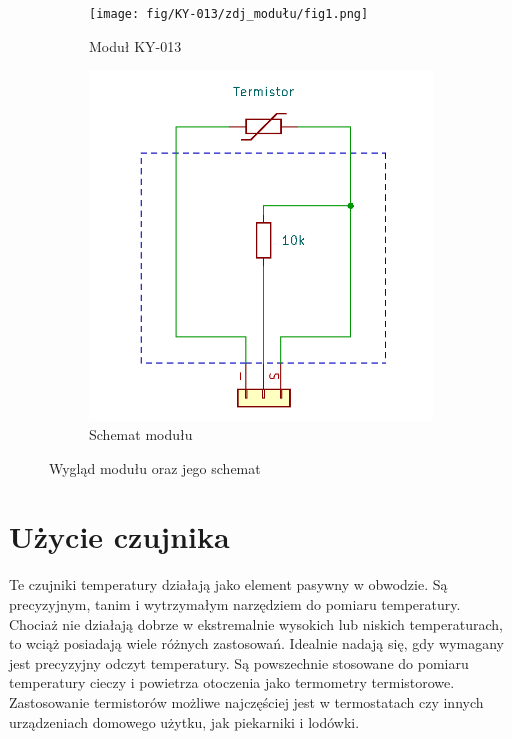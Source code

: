 \documentclass[11pt, a4paper]{article}
\begin{document}
\begin{figure}[h!]
\centering
\begin{subfigure}{.5\textwidth}
  \centering
  \texttt{[image: fig/KY-013/zdj\_modułu/fig1.png]}
  \caption{Moduł KY-013 \cite{ArduinoModules:Switch}}
  \label{fig:sub1}
\end{subfigure}%
\begin{subfigure}{.5\textwidth}
  \centering
\includegraphics[width=.81\linewidth]{fig/KY-013/zasada_dzialania/schemacik.png}
\caption{Schemat modułu}
  \label{fig:sub2}
\end{subfigure}
\caption{Wygląd modułu oraz jego schemat}
\label{fig:test}
\end{figure}

\newpage
\section*{Użycie czujnika}
Te czujniki temperatury działają jako element pasywny w obwodzie. Są precyzyjnym, tanim i wytrzymałym narzędziem do pomiaru temperatury. Chociaż nie działają dobrze w ekstremalnie wysokich lub niskich temperaturach, to wciąż posiadają wiele różnych zastosowań. Idealnie nadają się, gdy wymagany jest precyzyjny odczyt temperatury. Są powszechnie stosowane do pomiaru temperatury cieczy i powietrza otoczenia jako termometry termistorowe. Zastosowanie termistorów możliwe najczęściej jest w termostatach czy innych urządzeniach domowego użytku, jak piekarniki i lodówki.
\vspace{0.5cm}
\end{document}
